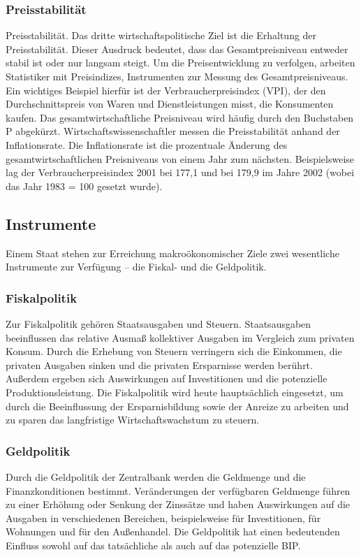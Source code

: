 \documentclass[10pt]{scrartcl}
\begin{document}
\subsubsection{Preisstabilität}
Preisstabilität. Das dritte wirtschaftspolitische Ziel ist die Erhaltung der Preisstabilität. Dieser Ausdruck bedeutet, dass das Gesamtpreisniveau entweder stabil ist oder nur langsam steigt. Um die Preisentwicklung zu verfolgen, arbeiten Statistiker mit Preisindizes, Instrumenten zur Messung des Gesamtpreisniveaus. Ein wichtiges Beispiel hierfür ist der Verbraucherpreisindex (VPI), der den Durchschnittspreis von Waren und Dienstleistungen misst, die Konsumenten kaufen. Das gesamtwirtschaftliche Preisniveau wird häufig durch den Buchstaben P abgekürzt. Wirtschaftswissenschaftler messen die Preisstabilität anhand der Inflationsrate. Die Inflationsrate ist die prozentuale Änderung des gesamtwirtschaftlichen Preisniveaus von einem Jahr zum nächsten. Beispielsweise lag der Verbraucherpreisindex 2001 bei 177,1 und bei 179,9 im Jahre 2002 (wobei das Jahr 1983 = 100 gesetzt wurde). 
\subsection{Instrumente}
Einem Staat stehen zur Erreichung makroökonomischer Ziele zwei wesentliche Instrumente zur Verfügung – die Fiskal- und die Geldpolitik.
\subsubsection{Fiskalpolitik}
Zur Fiskalpolitik gehören Staatsausgaben und Steuern. Staatsausgaben beeinflussen das relative Ausmaß kollektiver Ausgaben im Vergleich zum privaten Konsum. Durch die Erhebung von Steuern verringern sich die Einkommen, die privaten Ausgaben sinken und die privaten Ersparnisse werden berührt. Außerdem ergeben sich Auswirkungen auf Investitionen und die potenzielle Produktionsleistung. Die Fiskalpolitik wird heute hauptsächlich eingesetzt, um durch die Beeinflussung der Ersparnisbildung sowie der Anreize zu arbeiten und zu sparen das langfristige Wirtschaftswachstum zu steuern. 
\subsubsection{Geldpolitik}
Durch die Geldpolitik der Zentralbank werden die Geldmenge und die Finanzkonditionen bestimmt. Veränderungen der verfügbaren Geldmenge führen zu einer Erhöhung oder Senkung der Zinssätze und haben Auswirkungen auf die Ausgaben in verschiedenen Bereichen, beispielsweise für Investitionen, für Wohnungen und für den Außenhandel. Die Geldpolitik hat einen bedeutenden Einfluss sowohl auf das tatsächliche als auch auf das potenzielle BIP.
\end{document}
